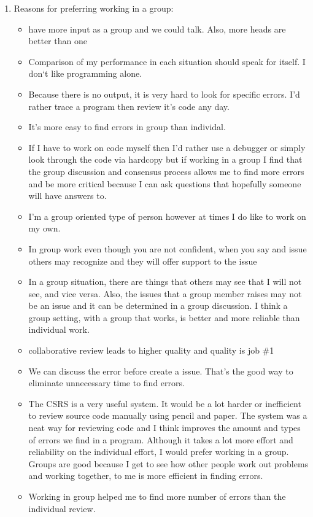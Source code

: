 \begin{enumerate}
\item  Reasons for preferring working in a group: 
\begin{itemize}
\item have more input as a group and we could talk.
Also, more heads are better than one

\item Comparison of my performance in each situation should speak for itself.
I don`t like programming alone.
\item Because there is no output, it is very hard to look for specific
errors.  I'd rather trace a program then review it's code any day.

\item It's more easy to find errors in group than individal.
\item If I have to work on code myself then I'd rather use a debugger or
simply look through the code via hardcopy but if working in a group I
find that the group discussion and consensus process allows me to find
more errors and be more critical because I can ask questions that
hopefully someone will have answers to.
\item I'm a group oriented type of person however at times I do like to work
on my own.

\item In group work even though you are not confident,
when you say and issue others may recognize and they will offer
support to the issue
\item In a group situation, there are things that others may see that I will
not see, and vice versa.  Also, the issues that a group member raises
may not be an issue and it can be determined in a group discussion.  I
think a group setting, with a group that works, is better and more
reliable than individual work.
\item collaborative review leads to higher quality and quality is job \#1
\item We can discuss the error before create a issue.  That's the good way
to eliminate unnecessary time to find errors.

\item The CSRS is a very useful system.  It would be a lot harder or
inefficient to review source code manually using pencil and paper. The
system was a neat way for reviewing code and I think improves the
amount and types of errors we find in a program.  Although it takes a
lot more effort and reliability on the individual effort, I would
prefer working in a group.  Groups are good because I get to see how
other people work out problems and working together, to me is more
efficient in finding errors. 
\item Working in group helped me to find more number of errors than the
individual review.


\end{itemize}
\end{enumerate}
